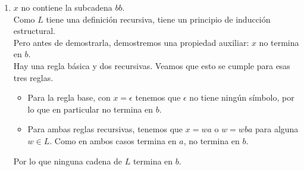 \documentclass{article}
\begin{document}
\begin{enumerate}
{\begin{enumerate}
{\begin{itemize}
{\begin{itemize}
{                                    Case 2, $w = xba$.\\
                                    Entonces, $n_a(xba) = n_a(x) + 1$ y
                                    $n_b(xba) = n_b(x) + 1$.\\ 
                                    Y por hipótesis, tenemos que 
                                    $n_a(x) \geq n_b(x)$, por lo que que 
                                    $n_a(xba) = n_a(x) + 1 \geq n_b(x) + 1 
                                    = n_b(xba)$.
                                }
                            \end{itemize}
                        }
                    \end{itemize}
                }
                \item {
                    $x$ no contiene la subcadena $bb$.\\
                    Como $L$ tiene una definición recursiva, tiene un principio 
                    de inducción estructural.\\
                    Pero antes de demostrarla, demostremos una propiedad auxiliar:
                    $x$ no termina en $b$.\\
                    Hay una regla básica y dos recursivas. Veamos que esto se 
                    cumple para esas tres reglas.

                    \begin{itemize}
                        \item {
                            Para la regla base, con $x = \epsilon$ tenemos que 
                            $\epsilon$ no tiene ningún símbolo, por lo que en 
                            particular no termina en $b$.
                        }
                        \item {
                            Para ambas reglas recursivas, tenemos que 
                            $x = wa$ o $w = wba$ para alguna $w \in L$. Como 
                            en ambos casos termina en $a$, no termina en $b$.
                        }
                    \end{itemize}
                    Por lo que ninguna cadena de $L$ termina en $b$. 

}
\end{enumerate}}
\end{enumerate}
\end{document}
